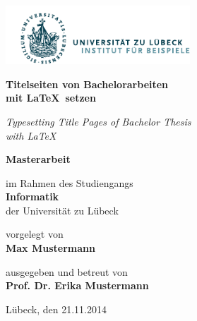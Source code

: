 \documentclass{scrbook}
\begin{document}
\begin{titlepage}
  \thispagestyle{empty}

  \vspace{1cm}
  \includegraphics[height=22mm]{beispiel-logo.pdf}
  
  \vspace{2.5cm}
  \LARGE
  \textbf{\sffamily\color{maincolor}Titelseiten von Bachelorarbeiten\\
    mit \LaTeX\ setzen}

  \textit{Typesetting Title Pages of Bachelor Thesis\\
    with \LaTeX}

  \normalfont\normalsize
  \vspace{2em}
  \textbf{\sffamily\color{maincolor}Masterarbeit}

  im Rahmen des Studiengangs \\
  \textbf{\sffamily\color{maincolor}Informatik} \\
  der Universität zu Lübeck

  \vspace{1em}
  vorgelegt von \\
  \textbf{\sffamily\color{maincolor}Max Mustermann}

  \vspace{1em}
  ausgegeben und betreut von \\
  \textbf{\sffamily\color{maincolor}Prof. Dr. Erika Mustermann}

  \vfill
  Lübeck, den 21.11.2014
\end{titlepage}
\end{document}
